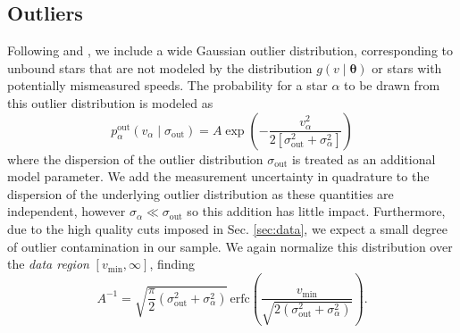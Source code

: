 \subsection{Outliers}
Following \cite{williams:2017} and \cite{Necib2022methods}, we include a wide Gaussian outlier distribution, corresponding to unbound stars that are not modeled by the distribution $g(v \mid \mathbf{\theta})$ or stars with potentially mismeasured speeds. The probability for a star $\alpha$ to be drawn from this outlier distribution is modeled as 
\begin{equation}\label{eq:outlier}
    p_\alpha^{\mathrm{out}}\left(v_\alpha \mid \sigma_{\mathrm{out}}\right)=A \exp \left(-\frac{v_\alpha^2}{2\left[\sigma_{\mathrm{out}}^2+\sigma_{ \alpha}^2\right]}\right)
\end{equation}
where the dispersion of the outlier distribution $\sigma_{\mathrm{out}}$ is treated as an additional model parameter. We add the measurement uncertainty in quadrature to the dispersion of the underlying outlier distribution as these quantities are independent, however $\sigma_\alpha\ll \sigma_{\mathrm{out}}$  so this addition has little impact. Furthermore, due to the high quality cuts imposed in Sec. \ref{sec:data}, we expect a small degree of outlier contamination in our sample. We again normalize this distribution over the \textit{data region} $[v_\mathrm{min},\infty]$, finding 
\begin{equation}
    A^{-1}=\sqrt{\frac{\pi}{2}\left(\sigma_{\mathrm{out}}^2+\sigma_{\alpha}^2\right)} \,\mathrm{erfc}\left(\frac{v_{\min }}{ \sqrt{2\left(\sigma_{\mathrm{out}}^2+\sigma_{\alpha}^2\right)}}\right) .
\end{equation}

